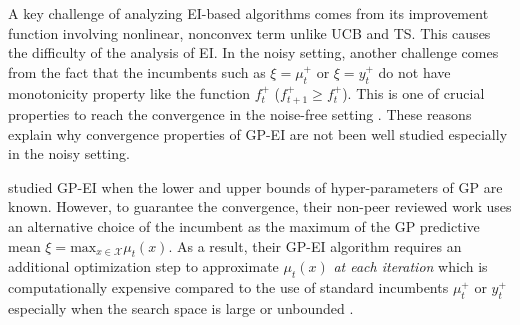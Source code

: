 \documentclass[twoside]{article}
\begin{document}
A key challenge of analyzing EI-based algorithms comes from its improvement function involving nonlinear, nonconvex term unlike UCB and TS. This causes the difficulty of the analysis of EI. In the noisy setting, another challenge comes from the fact that the incumbents such as $\xi = \mu^+_t$ or $\xi = y^+_t$ do not have monotonicity property like the function $f^+_t$ ($f^+_{t+1} \ge f^+_t$). This is one of crucial properties to reach the convergence in the noise-free setting \citep{Bull11}. These reasons explain why convergence properties of GP-EI are not been well studied especially in the noisy setting.

\citet{wang2014} studied GP-EI when the lower and upper bounds of hyper-parameters of GP are known. However, to guarantee the convergence, their non-peer reviewed work uses an alternative choice of the incumbent as the maximum of the GP predictive mean $\xi = \text{max}_{x \in \mathcal X} \mu_t(x)$. As a result, their GP-EI algorithm requires an additional optimization step to approximate $\mu_t(x)$ \emph{at each iteration} which is computationally expensive compared to the use of standard incumbents $\mu^+_t$ or $y^+_t$ especially when the search space is large or unbounded \citep{Tran-The_20}.
\end{document}
